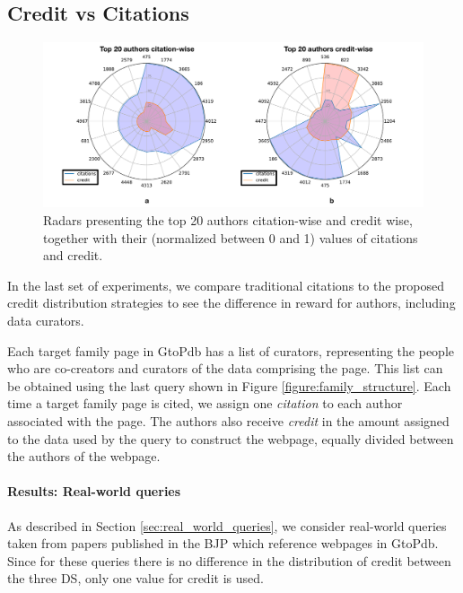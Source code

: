 
\subsection{Credit vs Citations}

\begin{figure}[]
\centering
  \includegraphics[width=1\textwidth]{figures/2_radars}
  \caption{Radars presenting the top 20 authors citation-wise and credit wise, together with their (normalized between 0 and 1) values of citations and credit.}
  \label{figure:2_radars}
\end{figure}


In the last set of experiments, we compare traditional citations to the proposed credit distribution strategies to see the difference in reward for authors, including data curators.  


Each target family page in GtoPdb has a list of curators, representing the people who are co-creators and curators of the data comprising the page. This list can be obtained using the last query shown in Figure \ref{figure:family_structure}. 
Each time a target family page is cited, we assign one {\em citation} to each author associated with the page.  The authors also receive {\em credit} in the amount assigned to the data used by the query to construct the webpage, equally divided between the authors of the webpage.


\paragraph{Results: Real-world queries}
As described in Section \ref{sec:real_world_queries}, we consider real-world queries taken from papers published in the BJP which reference webpages in GtoPdb.
Since for these queries there is no difference in the distribution of credit between the three DS, only one value for credit is used.

